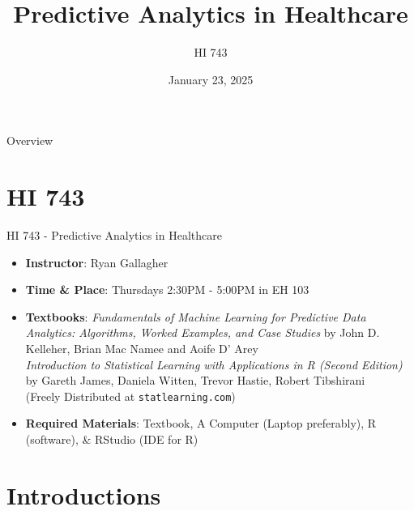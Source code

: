 \documentclass[aspectratio=169,xcolor=dvipsnames]{beamer}
\title{Predictive Analytics in Healthcare}
\subtitle{HI 743}
\author{}
\institute
{
    Department of Health Informatics and Administration \\
    Zilber College of Public Health \\
    University of Wisconsin - Milwaukee%
}
\date{January 23, 2025} %
\begin{document}
\begin{frame}
    \titlepage
\end{frame}

\begin{frame}{Overview}
    \tableofcontents
\end{frame}
\section{HI 743}
\begin{frame}{HI 743 - Predictive Analytics in Healthcare}
    \begin{itemize}
        \item \textbf{Instructor}: Ryan Gallagher
        \item \textbf{Time \& Place}: Thursdays 2:30PM - 5:00PM in EH 103
        \item \textbf{Textbooks}: \textit{Fundamentals of Machine Learning for Predictive Data Analytics: Algorithms, Worked Examples, and Case Studies} by John D. Kelleher, Brian Mac Namee and Aoife D' Arey
        \\
        \vspace{0.2cm}
        \textit{Introduction to Statistical Learning with Applications in R (Second Edition)} by Gareth James, Daniela Witten, Trevor Hastie, Robert Tibshirani \\(Freely Distributed at \texttt{statlearning.com})
        \item \textbf{Required Materials}: Textbook, A Computer (Laptop preferably), R (software), \& RStudio (IDE for R)
    \end{itemize}
\end{frame}

\section{Introductions}
\end{document}
